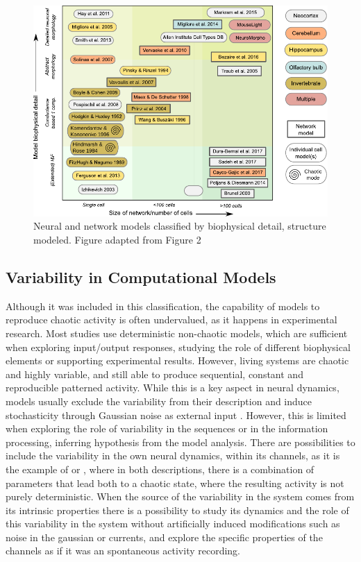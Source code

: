 \begin{figure}[bth!]
	\centering
	\includegraphics[width=\textwidth]{img/intro/models classification.pdf}
	\caption{Neural and network models classified by biophysical detail, structure modeled. Figure adapted from Figure 2 \cite{gleeson_open_2019}}
	\label{fig:models-classification}
\end{figure}

\subsection{Variability in Computational Models}

Although it was included in this classification, the capability of models to reproduce chaotic activity is often undervalued, as it happens in experimental research. Most studies use deterministic non-chaotic models, which are sufficient when exploring input/output responses, studying the role of different biophysical elements or supporting experimental results. However, living systems are chaotic and highly variable, and still able to produce sequential, constant and reproducible patterned activity. While this is a key aspect in neural dynamics, models usually exclude the variability from their description and induce stochasticity through Gaussian noise as external input \parencite{linaro_accurate_2011,pezo_diffusion_2014,zheng_spontaneous_2020}. However, this is limited when exploring the role of variability in the sequences or in the information processing, inferring hypothesis from the model analysis. There are possibilities to include the variability in the own neural dynamics, within its channels, as it is the example of \cite{hindmarsh_model_1984} or \cite{komendantov_deterministic_1996}, where in both descriptions, there is a combination of parameters that lead both to a chaotic state, where the resulting activity is not purely deterministic. When the source of the variability in the system comes from its intrinsic properties there is a possibility to study its dynamics and the role of this variability in the system without artificially induced modifications such as noise in the gaussian or currents, and explore the specific properties of the channels as if it was an spontaneous activity recording.

